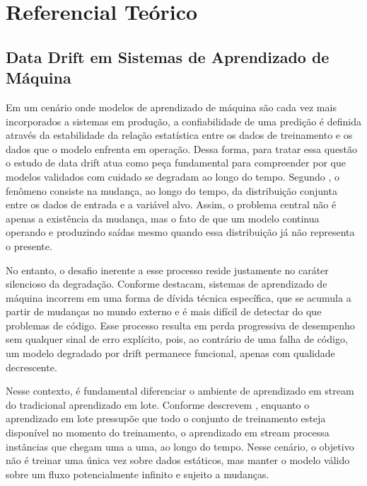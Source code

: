 \chapter{Referencial Teórico}

\section{Data Drift em Sistemas de Aprendizado de Máquina}
Em um cenário onde modelos de aprendizado de máquina são cada vez mais
incorporados a sistemas em produção, a confiabilidade de uma predição é
definida através da estabilidade da relação estatística entre os dados de
treinamento e os dados que o modelo enfrenta em operação. Dessa forma, para
tratar essa questão o estudo de data drift atua como peça fundamental para
compreender por que modelos validados com cuidado se degradam ao longo do
tempo. Segundo , o fenômeno consiste na mudança, ao
longo do tempo, da distribuição conjunta entre os dados de entrada e a
variável alvo. Assim, o problema central não é apenas a existência da
mudança, mas o fato de que um modelo continua operando e produzindo saídas
mesmo quando essa distribuição já não representa o presente.

No entanto, o desafio inerente a esse processo reside justamente no caráter
silencioso da degradação. Conforme  destacam,
sistemas de aprendizado de máquina incorrem em uma forma de dívida técnica
específica, que se acumula a partir de mudanças no mundo externo e é mais
difícil de detectar do que problemas de código. Esse processo resulta em
perda progressiva de desempenho sem qualquer sinal de erro explícito, pois,
ao contrário de uma falha de código, um modelo degradado por drift permanece
funcional, apenas com qualidade decrescente.

Nesse contexto, é fundamental diferenciar o ambiente de aprendizado em stream
do tradicional aprendizado em lote. Conforme descrevem ,
enquanto o aprendizado em lote pressupõe que todo o conjunto de treinamento
esteja disponível no momento do treinamento, o aprendizado em stream processa instâncias
que chegam uma a uma, ao longo do tempo. Nesse cenário, o objetivo não é
treinar uma única vez sobre dados estáticos, mas manter o modelo válido
sobre um fluxo potencialmente infinito e sujeito a mudanças.

